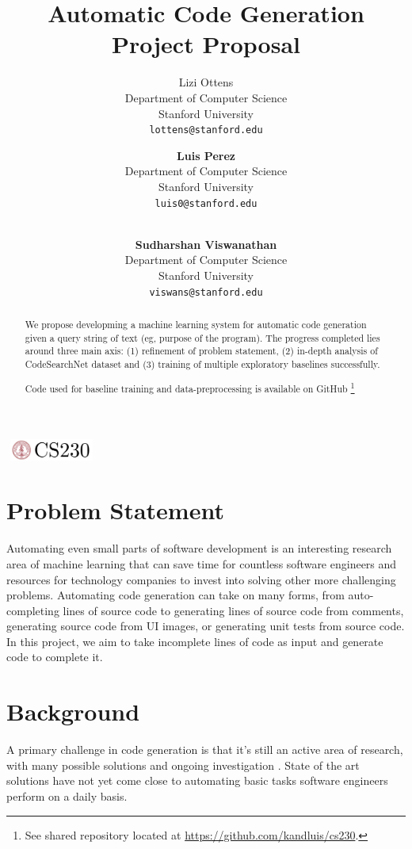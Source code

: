 \documentclass{article}
\title{Automatic Code Generation Project Proposal}
\author{
  Lizi Ottens  \\
  Department of Computer Science\\
  Stanford University\\
  \texttt{lottens@stanford.edu}
  
  \and
  
  \textbf{Luis Perez} \\
  Department of Computer Science \\
  Stanford University \\
  \texttt{luis0@stanford.edu}
  
  \and
  
  \\
  \textbf{Sudharshan Viswanathan} \\
  Department of Computer Science \\
  Stanford University \\
  \texttt{viswans@stanford.edu}
}
\begin{document}

\begin{center}
\includegraphics[width=3cm, height=0.7cm]{CS230}
\end{center}

\maketitle

\begin{abstract}
We propose developming a machine learning system for automatic code generation given a query string of text (eg, purpose of the program). The progress completed lies around three main axis: (1) refinement of problem statement, (2) in-depth analysis of CodeSearchNet dataset and (3) training of multiple exploratory baselines successfully.

Code used for baseline training and data-preprocessing is available on GitHub \footnote{See shared repository located at \href{https://github.com/kandluis/cs230}{https://github.com/kandluis/cs230}.}
\end{abstract}

\section{Problem Statement}
Automating even small parts of software development is an interesting research area \cite{survey} of machine learning that can save time for countless software engineers and resources for technology companies to invest into solving other more challenging problems. Automating code generation can take on many forms, from auto-completing lines of source code to generating lines of source code from comments, generating source code from UI images, or generating unit tests from source code. In this project, we aim to take incomplete lines of code as input and generate code to complete it.

\section{Background}
A primary challenge in code generation is that it’s still an active area of research, with many possible solutions and ongoing investigation \cite{structural_code_modeling}. State of the art solutions have not yet come close to automating basic tasks software engineers perform on a daily basis.
\end{document}
